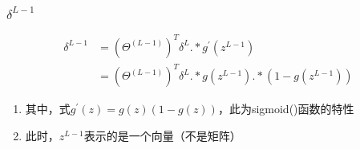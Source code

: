 
\subsubsection{$\delta^{L-1}$}
\begin{equation}\begin{aligned}
	\delta^{L-1} &= (\Theta^{(L-1)})^T \delta^{L} .* g^{'}(z^{L-1}) \\
	&= (\Theta^{(L-1)})^T \delta^{L} .* g(z^{L-1}) .* (1-g(z^{L-1}))
\end{aligned}\end{equation}
\begin{enumerate}
	\item 其中，式$g^{'}(z) = g(z)(1-g(z))$，此为sigmoid()函数的特性
	\item 此时，$z^{L-1}$表示的是一个向量（不是矩阵）
\end{enumerate}

